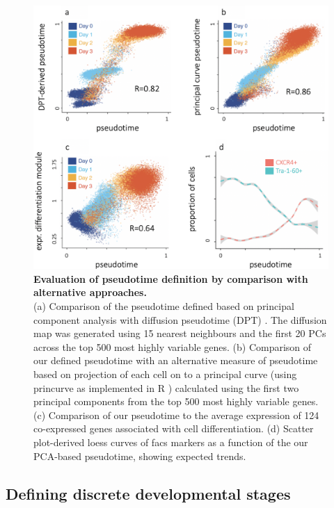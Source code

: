 \begin{figure}[htbp]
\centering
\includegraphics[width=14cm]{Chapter4/Fig/endodiff_pseudotimes.png}
\caption[Evaluation of pseudotime definition]{\textbf{Evaluation of pseudotime definition by comparison with alternative approaches.}\\
(a) Comparison of the pseudotime defined based on principal component analysis with diffusion pseudotime (DPT) \cite{haghverdi2016diffusion}. 
The diffusion map was generated using 15 nearest neighbours and the first 20 PCs across the top 500 most highly variable genes.  
(b) Comparison of our defined pseudotime with an alternative measure of pseudotime based on projection of each cell on to a principal curve (using princurve as implemented in R \cite{hastie1989principal}) calculated using the first two principal components from the top 500 most highly variable genes. 
(c) Comparison of our pseudotime to the average expression of 124 co-expressed genes associated with cell differentiation. 
(d) Scatter plot-derived loess curves of \gls{facs} markers as a function of the our PCA-based pseudotime, showing expected trends.}
\label{fig:endodiff_pseudotimes}
\end{figure}

\subsection{Defining discrete developmental stages}


